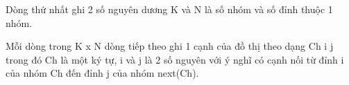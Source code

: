 Dòng thứ nhất ghi 2 số nguyên dương K và N là số nhóm và số đỉnh thuộc 1 nhóm.  

   Mỗi dòng trong K x N dòng tiếp theo ghi 1 cạnh của đồ thị theo dạng Ch i j trong đó Ch là một ký tự, i và j là 2 số nguyên với ý nghĩ có cạnh nối từ đỉnh i của nhóm Ch đến đỉnh j của nhóm next(Ch).